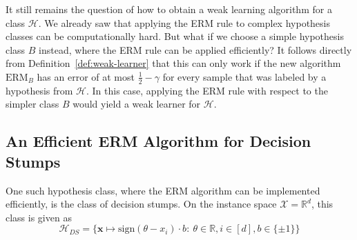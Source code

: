 It still remains the question of how to obtain a weak learning algorithm for a class $\mathcal{H}$.
We already saw that applying the ERM rule to complex hypothesis classes can be computationally hard.
But what if we choose a simple hypothesis class $B$ instead, where the ERM rule can be applied efficiently?
It follows directly from Definition~\ref{def:weak-learner} that this can only work if the new algorithm
$\text{ERM}_B$ has an error of at most $\frac{1}{2} - \gamma$ for every sample that was labeled by a hypothesis from
$\mathcal{H}$. In this case, applying the ERM rule with respect to the simpler class $B$ would yield a weak learner
for $\mathcal{H}$.

\subsection{An Efficient ERM Algorithm for Decision Stumps}

One such hypothesis class, where the ERM algorithm can be implemented efficiently, is the class of decision stumps.
On the instance space $\mathcal{X} = \mathbb{R}^d$,  this class is given as
\begin{equation*}
    \mathcal{H}_{DS} = \{ \mathbf{x} \mapsto \text{sign}\left( \theta - x_i \right) \cdot b: \ 
        \theta \in \mathbb{R}, i \in \left[ d \right], b \in \{ \pm 1 \} \}
\end{equation*}
